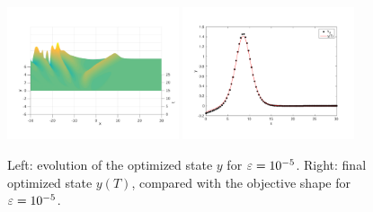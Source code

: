 \begin{figure}[!h]
 \includegraphics[width = 0.45\textwidth]{images/ex2state3d.pdf}
 \includegraphics[width = 0.45\textwidth]{images/controlledstate.pdf}
 \caption{Left: evolution of the optimized state $y$ for $\varepsilon = 10^{-5}$. Right: final optimized state $y(T)$, compared with the objective shape for $\varepsilon = 10^{-5}$.}
 \label{ex2fullgammadm5}
\end{figure}


\clearpage

